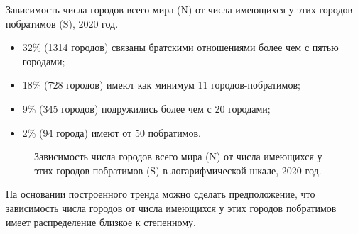 \begin{marginfigure}[0.0cm]
{
\setlength{\fboxsep}{0pt}%
\setlength{\fboxrule}{1pt}%
}
  \caption{Зависимость числа городов всего мира (N) от числа имеющихся у этих городов побратимов (S), 2020 год.}
  \label{fig:city_relation_S_N}
\end{marginfigure}

\begin{itemize}
\item 32\% (\num{1314} городов) связаны братскими отношениями более чем с пятью городами;
\item 18\% (728 городов) имеют как минимум 11 городов-побратимов;
\item 9\% (345 городов) подружились более чем с 20 городами;
\item 2\% (94 города) имеют от 50 побратимов.
\end{itemize}

\begin{figure*}[h]
{
\setlength{\fboxsep}{0pt}%
\setlength{\fboxrule}{1pt}%
%
}
  \caption{Зависимость числа городов всего мира (N) от числа имеющихся у этих городов побратимов (S) в логарифмической шкале, 2020 год.}%
  \label{fig:city_ln_relation_S_N}%
\end{figure*}

На основании построенного тренда можно сделать предположение, что зависимость числа городов от числа имеющихся у этих городов побратимов имеет распределение близкое к степенному.

